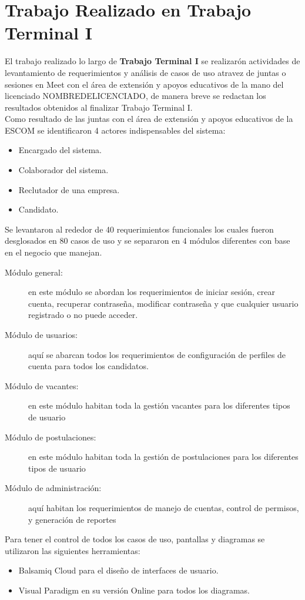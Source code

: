 \section{Trabajo Realizado en Trabajo Terminal I}
El trabajo realizado lo largo de \textbf{Trabajo Terminal I} se realizarón actividades de levantamiento de requerimientos y análisis de casos de uso atravez de juntas 
o sesiones en Meet con el área de extensión y apoyos educativos de la mano del licenciado NOMBREDELICENCIADO, de manera breve se redactan los resultados obtenidos al finalizar Trabajo Terminal I.\\

Como resultado de las juntas con el área de  extensión y apoyos educativos de la ESCOM se identificaron 4 actores indispensables del sistema:
    \begin{itemize}
        \item Encargado del sistema.
        \item Colaborador del sistema.
        \item Reclutador de una empresa.
        \item Candidato.
    \end{itemize}

Se levantaron al rededor de 40 requerimientos funcionales los cuales fueron desglosados en 80 casos de uso y se separaron en 4 módulos diferentes con base en el negocio que
manejan.
    \begin{description}
        \item[Módulo general:] en este módulo se abordan los requerimientos de iniciar sesión, crear cuenta, recuperar contraseña, modificar contraseña y que cualquier usuario registrado o no puede acceder.
        \item[Módulo de usuarios:] aquí se abarcan todos los requerimientos de configuración de perfiles de cuenta para todos los candidatos.
        \item[Módulo de vacantes:] en este módulo habitan toda la gestión vacantes para los diferentes tipos de usuario
        \item[Módulo de postulaciones:]  en este módulo habitan toda la gestión de postulaciones para los diferentes tipos de usuario
        \item[Módulo de administración:] aquí habitan los requerimientos de manejo de cuentas, control de permisos, y generación de reportes
    \end{description} 

Para tener el control de todos los casos de uso, pantallas y diagramas se utilizaron las siguientes herramientas:
    \begin{itemize} 
        \item Balsamiq Cloud para el diseño de interfaces de usuario.
        \item Visual Paradigm en su versión Online para todos los diagramas.
    \end{itemize} 

